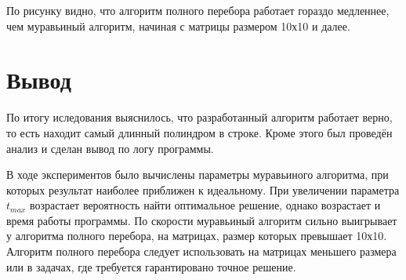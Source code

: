 \clearpage
По рисунку видно, что алгоритм полного перебора  работает гораздо медленнее, чем муравьиный алгоритм, начиная с матрицы размером 10х10 и далее.

\section{Вывод}
По итогу иследования выяснилось, что разработанный алгоритм работает верно, то есть находит самый длинный полиндром в строке. Кроме этого был проведён анализ и сделан вывод по логу программы.

В ходе экспериментов было вычислены параметры муравьиного алгоритма, при которых результат наиболее приближен к идеальному. При увеличении параметра $t_{max}$ возрастает вероятность найти оптимальное решение, однако возрастает и время работы программы. По скорости муравьиный алгоритм сильно выигрывает у алгоритма полного перебора, на матрицах, размер которых превышает 10х10. Алгоритм полного перебора следует использовать на матрицах меньшего размера или в задачах, где требуется гарантировано точное решение.